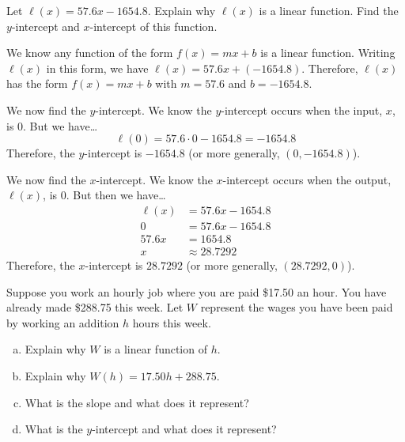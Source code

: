 \documentclass[11pt,letterpaper]{article}
\begin{document}
 Let $\ell(x)= 57.6x - 1654.8$. Explain why $\ell(x)$ is a linear function. Find the $y$-intercept and $x$-intercept of this function. \pspace

\sol We know any function of the form $f(x)= mx + b$ is a linear function. Writing $\ell(x)$ in this form, we have $\ell(x)= 57.6x + (-1654.8)$. Therefore, $\ell(x)$ has the form $f(x)= mx + b$ with $m= 57.6$ and $b= -1654.8$. \pspace

We now find the $y$-intercept. We know the $y$-intercept occurs when the input, $x$, is 0. But we have\dots
	\[
	\ell(0)= 57.6 \cdot 0 - 1654.8= -1654.8
	\]
Therefore, the $y$-intercept is $-1654.8$ (or more generally, $(0, -1654.8)$). \pspace

We now find the $x$-intercept. We know the $x$-intercept occurs when the output, $\ell(x)$, is 0. But then we have\dots
	\[
	\begin{aligned}
	\ell(x)&= 57.6x - 1654.8 \\[0.3cm]
	0&= 57.6x - 1654.8 \\[0.3cm]
	57.6x&= 1654.8 \\[0.3cm]
	x&\approx 28.7292
	\end{aligned}
	\]
Therefore, the $x$-intercept is $28.7292$ (or more generally, $(28.7292, 0)$). 



\newpage



 Suppose you work an hourly job where you are paid \$17.50 an hour. You have already made \$288.75 this week. Let $W$ represent the wages you have been paid by working an addition $h$ hours this week.
	\begin{enumerate}[(a)]
	\item Explain why $W$ is a linear function of $h$. 
	\item Explain why $W(h)= 17.50h + 288.75$.
	\item What is the slope and what does it represent?
	\item What is the $y$-intercept and what does it represent?
	\end{enumerate} \pspace
\end{document}
